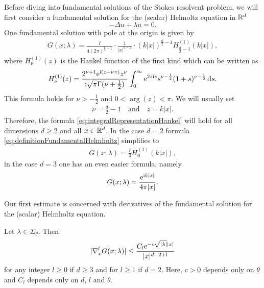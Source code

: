 Before diving into fundamental solutions of the Stokes resolvent problem, we will first consider a fundamental solution for the (scalar) Helmoltz equation in $\mathbb{R}^d$
$$
-\Delta u + \lambda u = 0.
$$
One fundamental solution with pole at the origin is given by
\begin{align}
  \label{eq:definitionFundamentalHelmholtz}
  G(x; \lambda) = \frac{\ii}{4 ( 2\pi )^{\frac{d}{2} - 1}} \cdot \frac{1}{|x|^{d - 2}} \cdot (k |x|)^{\frac{d}{2} - 1} H_{\frac{d}{2} - 1}^{(1)} (k|x|),
\end{align}
where $H_{\nu}^{(1)}(z)$ is the Hankel function of the first kind which can be written as
\begin{align}
  \label{eq:integralRepresentationHankel}
  H_\nu^{(1)}(z) = \frac{2^{\nu + 1} \mathrm{e}^{\mathrm{i}(z - \nu \pi)} z^\nu}{\mathrm{i} \sqrt{\pi} \Gamma(\nu + \frac{1}{2})} \int_0^\infty \mathrm{e}^{2 z \mathrm{i} s} s^{\nu - \frac{1}{2}} (1 + s)^{\nu - \frac{1}{2}} \, {\operatorname{d}\!{s}}.
\end{align}
This formula holds for $\nu > -\frac{1}{2}$ and $0 < \arg(z) < \pi$.
We will usually set 
\begin{align*}
\nu = \frac{d}{2} - 1 \quad\text{and}\quad z = k|x|. 
\end{align*}
Therefore, the formula \eqref{eq:integralRepresentationHankel} will hold for all dimensions $d \geq 2$ and all $x \in \mathbb{R}^d$.
In the case $d = 2$ formula \eqref{eq:definitionFundamentalHelmholtz} simplifies to 
\begin{align}
  \label{eq:2dDefinitionFundamentalHelmholtz}
  G(x;\lambda) = \frac{\ii}{4} H_{0}^{(1)}(k|x|),
\end{align}
in the case $d = 3$ one has an even easier formula, namely
\begin{align}
  \label{eq:3dDefinitionFundamentalHelmholtz}
  G(x; \lambda) = \frac{\mathrm{e}^{\mathrm{i} k |x|}}{4 \pi |x|}.
\end{align}

Our first estimate is concerned with derivatives of the fundamental solution for the (scalar) Helmholtz equation.

\begin{lem}
  \label{lem:estimateHelmholtzDerivatives}
  Let $\lambda \in \Sigma_\theta$.
  Then
  \begin{align}
    \label{eq:estimateHelmholtzDerivatives}
    |\nabla_x^l G(x; \lambda)| \leq \frac{ C_l \mathrm{e}^{-c \sqrt{|\lambda|} |x|}}{|x|^{d - 2 + l}}
  \end{align}
  for any integer $l \geq 0$ if $d \geq 3$ and for $l \geq 1$ if $d = 2$.
  Here, $c > 0$ depends only on $\theta$ and $C_l$ depends only on $d$, $l$ and $\theta$.
\end{lem}

